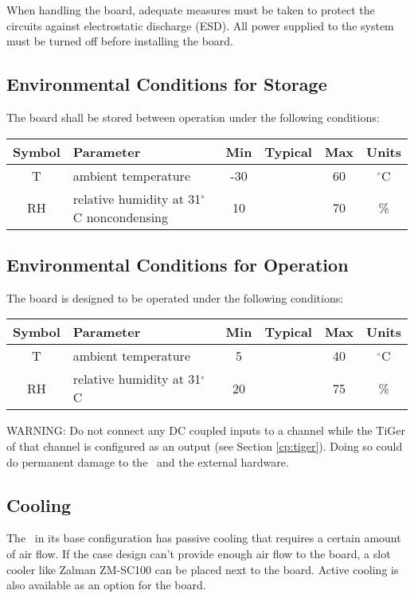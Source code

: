 	When handling the board, adequate measures must be taken to protect the circuits against electrostatic discharge (ESD). All power supplied to the system must be turned off before installing the board.

\newpage
\subsection{Environmental Conditions for Storage}

	The board shall be stored between operation under the following conditions:

	\noindent
	\begin{tabularx}{\textwidth}{|c|X|c|c|c|c|}
		\hline
		Symbol & Parameter & Min & Typical & Max & Units\\
		\hline\hline
		T & ambient temperature & -30 && 60 & $^{\circ}$C\\
		\hline
		RH & relative humidity at 31$^{\circ}$C noncondensing & 10 && 70 & \%\\
		\hline
	\end{tabularx}

\subsection{Environmental Conditions for Operation}

	The board is designed to be operated under the following conditions:

	\noindent
	\begin{tabularx}{\textwidth}{|c|X|c|c|c|c|}
		\hline
		Symbol & Parameter & Min & Typical & Max & Units\\
		\hline\hline
		T & ambient temperature & 5 && 40 & $^{\circ}$C\\
		\hline
		RH & relative humidity at 31$^{\circ}$C & 20 && 75 & \%\\
		\hline
	\end{tabularx}

	WARNING: Do not connect any DC coupled inputs to a channel while the TiGer of that channel is configured as an output (see Section \ref{cp:tiger}).
	Doing so could do permanent damage to the \deviceName\ and the external hardware.

\subsection{Cooling}

	The \deviceName\ in its base configuration has passive cooling that requires a certain amount of air flow. 
	If the case design can't provide enough air flow to the board, a slot cooler like Zalman ZM-SC100 can be placed next to the board. 
	Active cooling is also available as an option for the board.


